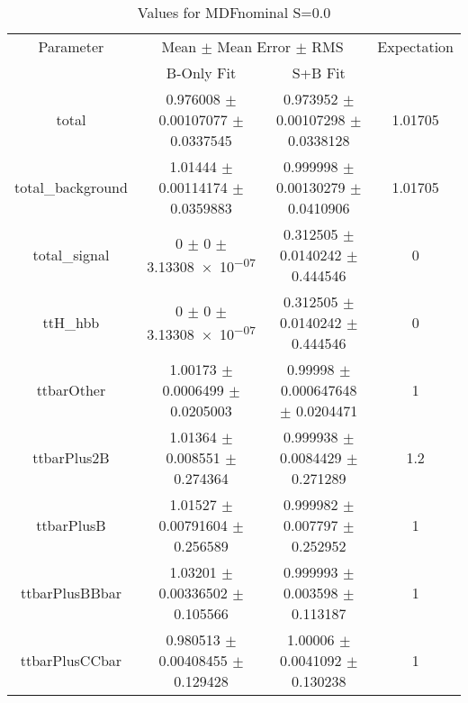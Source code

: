 \begin{table}
\centering
\caption{Values for MDFnominal S=0.0}
\begin{tabular}{cccc}
\toprule
Parameter & \multicolumn{2}{c}{Mean $\pm$ Mean Error $\pm$ RMS} & Expectation\\
 & B-Only Fit & S+B Fit & \\
\midrule
total & \num{0.976008} $\pm$ \num{0.00107077} $\pm$ \num{0.0337545} & \num{0.973952} $\pm$ \num{0.00107298} $\pm$ \num{0.0338128} & \num{1.01705}\\
total\_background & \num{1.01444} $\pm$ \num{0.00114174} $\pm$ \num{0.0359883} & \num{0.999998} $\pm$ \num{0.00130279} $\pm$ \num{0.0410906} & \num{1.01705}\\
total\_signal & \num{0} $\pm$ \num{0} $\pm$ \num{3.13308e-07} & \num{0.312505} $\pm$ \num{0.0140242} $\pm$ \num{0.444546} & \num{0}\\
ttH\_hbb & \num{0} $\pm$ \num{0} $\pm$ \num{3.13308e-07} & \num{0.312505} $\pm$ \num{0.0140242} $\pm$ \num{0.444546} & \num{0}\\
ttbarOther & \num{1.00173} $\pm$ \num{0.0006499} $\pm$ \num{0.0205003} & \num{0.99998} $\pm$ \num{0.000647648} $\pm$ \num{0.0204471} & \num{1}\\
ttbarPlus2B & \num{1.01364} $\pm$ \num{0.008551} $\pm$ \num{0.274364} & \num{0.999938} $\pm$ \num{0.0084429} $\pm$ \num{0.271289} & \num{1.2}\\
ttbarPlusB & \num{1.01527} $\pm$ \num{0.00791604} $\pm$ \num{0.256589} & \num{0.999982} $\pm$ \num{0.007797} $\pm$ \num{0.252952} & \num{1}\\
ttbarPlusBBbar & \num{1.03201} $\pm$ \num{0.00336502} $\pm$ \num{0.105566} & \num{0.999993} $\pm$ \num{0.003598} $\pm$ \num{0.113187} & \num{1}\\
ttbarPlusCCbar & \num{0.980513} $\pm$ \num{0.00408455} $\pm$ \num{0.129428} & \num{1.00006} $\pm$ \num{0.0041092} $\pm$ \num{0.130238} & \num{1}\\
\bottomrule
\end{tabular}
\end{table}